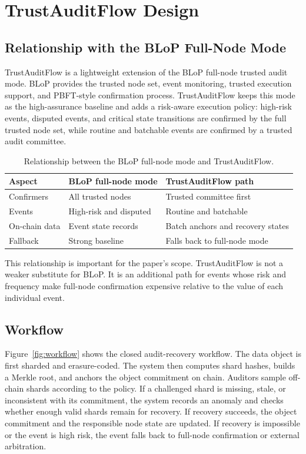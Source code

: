 \section{TrustAuditFlow Design}

\subsection{Relationship with the BLoP Full-Node Mode}

TrustAuditFlow is a lightweight extension of the BLoP full-node trusted audit mode. BLoP provides the trusted node set, event monitoring, trusted execution support, and PBFT-style confirmation process. TrustAuditFlow keeps this mode as the high-assurance baseline and adds a risk-aware execution policy: high-risk events, disputed events, and critical state transitions are confirmed by the full trusted node set, while routine and batchable events are confirmed by a trusted audit committee.

\begin{table}[t]
\centering
\caption{Relationship between the BLoP full-node mode and TrustAuditFlow.}
\label{tab:blop_relation}
\begin{tabular}{p{1.55cm}p{2.55cm}p{2.55cm}}
\toprule
Aspect & BLoP full-node mode & TrustAuditFlow path \\
\midrule
Confirmers & All trusted nodes & Trusted committee first \\
Events & High-risk and disputed & Routine and batchable \\
On-chain data & Event state records & Batch anchors and recovery states \\
Fallback & Strong baseline & Falls back to full-node mode \\
\bottomrule
\end{tabular}
\end{table}

This relationship is important for the paper's scope. TrustAuditFlow is not a weaker substitute for BLoP. It is an additional path for events whose risk and frequency make full-node confirmation expensive relative to the value of each individual event.

\subsection{Workflow}

Figure~\ref{fig:workflow} shows the closed audit-recovery workflow. The data object is first sharded and erasure-coded. The system then computes shard hashes, builds a Merkle root, and anchors the object commitment on chain. Auditors sample off-chain shards according to the policy. If a challenged shard is missing, stale, or inconsistent with its commitment, the system records an anomaly and checks whether enough valid shards remain for recovery. If recovery succeeds, the object commitment and the responsible node state are updated. If recovery is impossible or the event is high risk, the event falls back to full-node confirmation or external arbitration.

